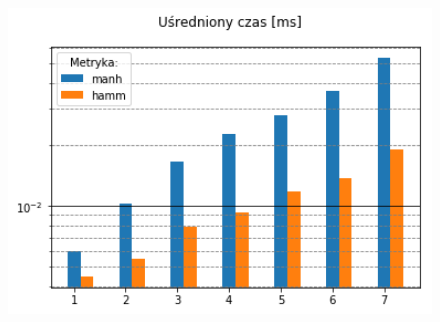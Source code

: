 \documentclass{classrep}
\begin{document}
\begin{figure}[H]
  \centering
    \begin{minipage}{0.45\textwidth}
        \centering
        \includegraphics[width=1.1\textwidth]{output_4_4.png} %
    \end{minipage}
\end{figure}



\restoregeometry
\end{document}
